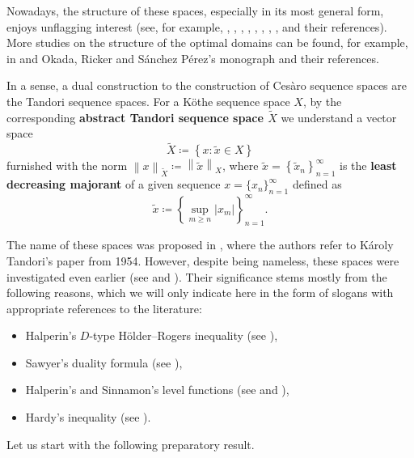 \documentclass[11pt]{amsart}
\theoremstyle{definition}
\theoremstyle{definition}
\theoremstyle{definition}
\theoremstyle{definition}
\theoremstyle{definition}
\theoremstyle{definition}
\theoremstyle{definition}
\theoremstyle{definition}
\numberwithin{equation}{section}
\numberwithin{equation}{section}
\numberwithin{equation}{section}
\theoremstyle{definition}
\theoremstyle{definition}
\theoremstyle{definition}
\theoremstyle{definition}
\theoremstyle{definition}
\theoremstyle{definition}
\newcommand{\norm}[1]{\left\lVert#1\right\rVert}
\newcommand{\abs}[1]{\left\lvert#1\right\rvert}
\begin{document}
Nowadays, the structure of these spaces, especially in its most general form, enjoys unflagging interest
(see, for example, \cite{ALM19}, \cite{CR16}, \cite{DS07}, \cite{KT24}, \cite{KKT22}, \cite{LM15a}, \cite{LM16}, \cite{MS06}, \cite{NP10} and their references).
More studies on the structure of the optimal domains can be found, for example, in \cite{Mas91} and
Okada, Ricker and S{\' a}nchez P{\' e}rez's monograph \cite{ORS08} and their references.

In a sense, a dual construction to the construction of Ces{\` a}ro sequence spaces are the Tandori sequence spaces.
For a K{\" o}the sequence space $X$, by the corresponding {\bf abstract Tandori sequence space $\widetilde{X}$} we understand a vector space
\begin{equation*}
	\widetilde{X} \coloneqq \left\{ x \colon \widetilde{x} \in X \right\}
\end{equation*}
furnished with the norm $\norm{x}_{\widetilde{X}} \coloneqq \norm{\widetilde{x}}_X$, where $\widetilde{x} = \left\{ \widetilde{x}_n \right\}_{n=1}^{\infty}$
is the {\bf least decreasing majorant} of a given sequence $x = \{x_n\}_{n=1}^{\infty}$ defined as
\begin{equation*}
	\widetilde{x} \coloneqq \left\{ \sup\limits_{m \geqslant n} \abs{x_m} \right\}_{n=1}^{\infty}.
\end{equation*}

The name of these spaces was proposed in \cite[p.~767]{LM16}, where the authors refer to K{\' a}roly Tandori's paper \cite{Tan55} from 1954.
However, despite being nameless, these spaces were investigated even earlier (see \cite{AM14} and \cite{LM15a}).
Their significance stems mostly from the following reasons, which we will only indicate here in the form of slogans with
appropriate references to the literature:
\begin{itemize}
	\item[$\bullet$] Halperin's $D$-type H{\" o}lder--Rogers inequality (see \cite{Hal53}),
	\item[$\bullet$] Sawyer's duality formula (see \cite{Saw90}),
	\item[$\bullet$] Halperin's and Sinnamon's level functions (see \cite{Hal53} and \cite{Si94}),
	\item[$\bullet$] Hardy's inequality (see \cite{Ste93}).
\end{itemize}

Let us start with the following preparatory result.
\end{document}
